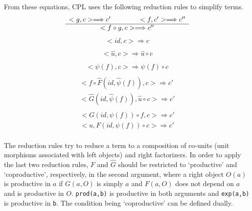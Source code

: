 From these equations, CPL uses the following reduction rules to simplify
terms.
\begin{displaymath}
\begin{array}{c}
<g,c> \Longrightarrow c' \makebox[4em]{} <f,c'> \Longrightarrow c'' \\
\hline
<f\circ g,c> \Longrightarrow c''\\
\end{array}
\end{displaymath}
\begin{displaymath}
\begin{array}{c}
<id,c> \Longrightarrow c \\
\end{array}
\end{displaymath}
\begin{displaymath}
\begin{array}{c}
<\hat{u},c> \Longrightarrow \hat{u}\circ c \\
\end{array}
\end{displaymath}
\begin{displaymath}
\begin{array}{c}
<\psi (f),c> \Longrightarrow \psi(f)\circ c \\
\end{array}
\end{displaymath}
\begin{displaymath}
\begin{array}{c}
<f\circ \hat{F}(id,\hat{\psi}(f)),c> \Longrightarrow c' \\
\hline
<\hat{G}(id,\hat{\psi}(f)),\hat{u}\circ c> \Longrightarrow
	c' \\
\end{array}
\end{displaymath}
\begin{displaymath}
\begin{array}{c}
<G(id,\psi (f))\circ f,c> \Longrightarrow c' \\
\hline
<u,F(id,\psi (f))\circ c> \Longrightarrow c' \\
\end{array}
\end{displaymath}

The reduction rules try to reduce a term to a composition of co-units (unit
morphisms associated with left objects) and right factorizers.  In order to
apply the last two reduction rules, $F$ and $\hat{G}$ should be restricted
to `productive' and `coproductive', respectively, in the second argument,
where a right object $O(a)$ is productive in $a$ if $G(a,O)$ is simply $a$
and $F(a,O)$ does not depend on $a$ and is productive in $O$.
 \verb"prod(a,b)" is productive in both arguments and \verb"exp(a,b)" is
productive in \verb"b".  The condition being `coproductive' can be defined
dually.

